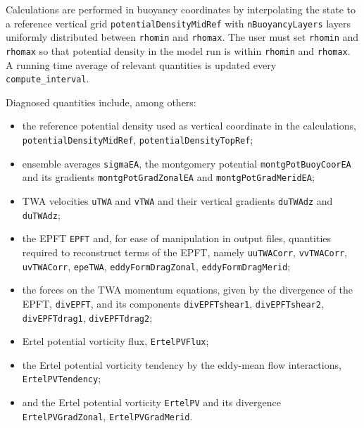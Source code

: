 Calculations are performed in buoyancy coordinates by interpolating the state to a reference vertical grid \verb+potentialDensityMidRef+ with \verb+nBuoyancyLayers+ layers uniformly distributed between \verb+rhomin+ and \verb+rhomax+. The user must set \verb+rhomin+ and \verb+rhomax+ so that potential density in the model run is within \verb+rhomin+ and \verb+rhomax+.
A running time average of relevant quantities is updated every \verb+compute_interval+.

Diagnosed quantities include, among others: 
\begin{itemize}
\item the reference potential density used as vertical coordinate in the calculations, \verb+potentialDensityMidRef+, \verb+potentialDensityTopRef+;
\item ensemble averages \verb+sigmaEA+, the montgomery potential \verb+montgPotBuoyCoorEA+ and its gradients \verb+montgPotGradZonalEA+ and \verb+montgPotGradMeridEA+; 
\item TWA velocities \verb+uTWA+ and \verb+vTWA+ and their vertical gradients \verb+duTWAdz+ and \verb+duTWAdz+; 
\item the EPFT \verb+EPFT+ and, for ease of manipulation in output files, quantities required to reconstruct terms of the EPFT, namely \verb+uuTWACorr+, \verb+vvTWACorr+, \verb+uvTWACorr+, \verb+epeTWA+, \verb+eddyFormDragZonal+, \verb+eddyFormDragMerid+;
\item the forces on the TWA momentum equations, given by the divergence of the EPFT, \verb+divEPFT+, and its components \verb+divEPFTshear1+, \verb+divEPFTshear2+, \verb+divEPFTdrag1+, \verb+divEPFTdrag2+;
\item Ertel potential vorticity flux, \verb+ErtelPVFlux+;
\item the Ertel potential vorticity tendency by the eddy-mean flow interactions, \verb+ErtelPVTendency+;
\item and the Ertel potential vorticity \verb+ErtelPV+ and its divergence \verb+ErtelPVGradZonal+, \verb+ErtelPVGradMerid+.
\end{itemize}
